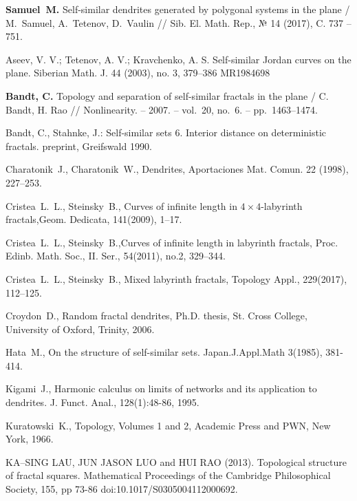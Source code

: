 \begin{thebibliography}{99}
{\bf Samuel~M.}
 Self-similar dendrites generated by polygonal systems in the plane /
 M.~Samuel, A.~Tetenov, D.~Vaulin // 
Sib. El. Math. Rep., № 14 (2017), C. 737 -- 751. 


 Aseev, V. V.; Tetenov, A. V.; Kravchenko, A. S. Self-similar Jordan curves on
the plane.  Siberian Math. J. 44 (2003), no. 3, 379--386 MR1984698

  {\bf Bandt, C.} Topology and separation of self-similar fractals in the plane / C. Bandt, H. Rao // Nonlinearity. -- 2007. -- vol.~20, no.~6. -- pp.~1463--1474.

 Bandt, C., Stahnke, J.: Self-similar sets 6. Interior distance on deterministic fractals.
preprint, Greifswald 1990.

  Charatonik~J., Charatonik~W., Dendrites, Aportaciones Mat. Comun.
22 (1998), 227--253.

 {Cristea~L.~L.}, {Steinsky~B.}, Curves of infinite length in $4 \times 4$-labyrinth fractals,{Geom. Dedicata}, 141(2009), 1--17.

 {Cristea~L.~L.}, {Steinsky~B.},Curves of infinite length in labyrinth fractals, {Proc. Edinb. Math. Soc., II. Ser.}, 54(2011), no.2, 329--344.


  {Cristea~L.~L.}, {Steinsky~B.}, Mixed labyrinth fractals, {Topology Appl.}, 229(2017), 112--125.

 Croydon~D., Random fractal dendrites, Ph.D. thesis, St. Cross College, University of Oxford, Trinity, 2006.

Hata~M., On the structure of self-similar sets. Japan.J.Appl.Math 3(1985), 381-414.

 Kigami~J., Harmonic calculus on limits of networks and its application to dendrites. J. Funct. Anal., 128(1):48-86, 1995.


Kuratowski~K.,  Topology, Volumes 1 and 2, Academic Press and PWN,
New York, 1966.

 KA–SING LAU, JUN JASON LUO and HUI RAO (2013). Topological structure of fractal squares.
Mathematical Proceedings of the Cambridge Philosophical Society, 155, pp 73-86 doi:10.1017/S0305004112000692.


\end{thebibliography}
